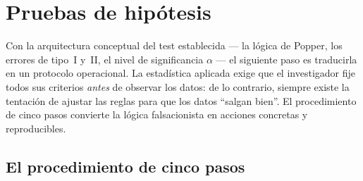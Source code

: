 \documentclass[12pt, a4paper]{book}
\numberwithin{equation}{chapter}
\begin{document}
\section{Pruebas de hip\'{o}tesis}

Con la arquitectura conceptual del test establecida
--- la l\'{o}gica de Popper, los errores de tipo~I
y~II, el nivel de significancia $\alpha$ --- el
siguiente paso es traducirla en un protocolo
operacional. La estad\'{i}stica aplicada exige que
el investigador fije todos sus criterios
\emph{antes} de observar los datos: de lo
contrario, siempre existe la tentaci\'{o}n de
ajustar las reglas para que los datos ``salgan
bien''. El procedimiento de cinco pasos convierte
la l\'{o}gica falsacionista en acciones concretas
y reproducibles.

\subsection{El procedimiento de cinco pasos}
\end{document}
